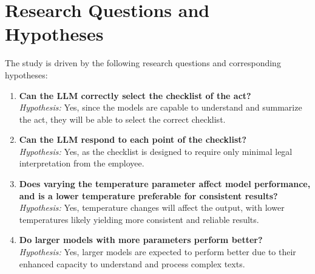 \documentclass[../main.tex]{subfiles}
\begin{document}
\section*{Research Questions and Hypotheses}
The study is driven by the following research questions and corresponding hypotheses:
\begin{enumerate}

    \item \textbf{Can the LLM correctly select the checklist of the act?} \\
    \textit{Hypothesis:} Yes, since the models are capable to understand and summarize the act, they will be able to select the correct checklist.
    
    \item \textbf{Can the LLM respond to each point of the checklist?} \\
    \textit{Hypothesis:} Yes, as the checklist is designed to require only minimal legal interpretation from the employee.
    
    \item \textbf{Does varying the temperature parameter affect model performance, and is a lower temperature preferable for consistent results?} \\
    \textit{Hypothesis:} Yes, temperature changes will affect the output, with lower temperatures likely yielding more consistent and reliable results.
    
    \item \textbf{Do larger models with more parameters perform better?} \\
    \textit{Hypothesis:} Yes, larger models are expected to perform better due to their enhanced capacity to understand and process complex texts.


\end{enumerate}
\end{document}
